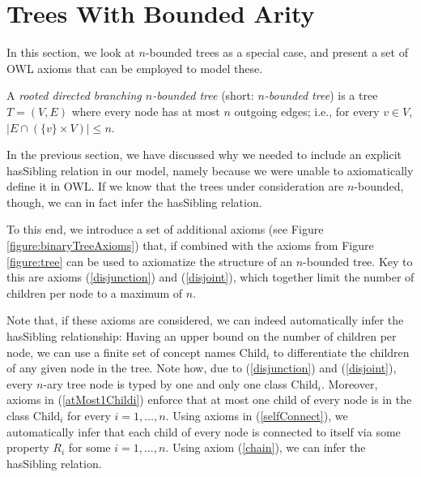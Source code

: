 \section{Trees With Bounded Arity}\label{sec:bin-trees}

In this section, we look at $n$-bounded trees as a special case, and present a set of OWL axioms that can be employed to model these.

\begin{definition}
A \emph{rooted directed branching $n$-bounded tree} (short: \emph{$n$-bounded tree}) is a tree $T = (V, E)$ where every node has at most $n$ outgoing edges; i.e., for every $v \in V$, $\vert E \cap (\{v\} \times V) \vert \leq n$.
\end{definition}

In the previous section, we have discussed why we needed to include an explicit hasSibling relation in our model, namely because we were unable to axiomatically define it in OWL. If we know that the trees under consideration are $n$-bounded, though, we can in fact infer the hasSibling relation. 

To this end, we introduce a set of additional axioms (see Figure \ref{figure:binaryTreeAxioms}) that, if combined with the axioms  from Figure \ref{figure:tree} can be used to axiomatize the structure of an $n$-bounded tree. Key to this 
are axioms (\ref{disjunction}) and (\ref{disjoint}), which together limit the number of children per node to a maximum of $n$. 

Note that, if these axioms are considered, we can indeed automatically infer the hasSibling relationship: Having an upper bound on the number of children per node, we can use a finite set of concept names $\text{Child}_i$ to differentiate the children of any given node in the tree.
Note how, due to (\ref{disjunction}) and (\ref{disjoint}), every $n$-ary tree node is typed by one and only one class $\text{Child}_i$.
Moreover, axioms in (\ref{atMost1Childi}) enforce that at most one child of every node is in the class $\text{Child}_i$ for every $i = 1, \ldots, n$.
Using axioms in (\ref{selfConnect}), we automatically infer that each child of every node is connected to itself via some property $R_i$ for some $i = 1, \ldots, n$.
Using axiom (\ref{chain}), %
we can infer the hasSibling relation.



